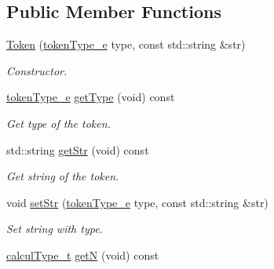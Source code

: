 \subsection*{Public Member Functions}
\begin{DoxyCompactItemize}
\item 
\hyperlink{class_token_ad84c27d6c4587fd359ffa52004bd370b}{Token} (\hyperlink{class_token_a706d105bff3282a406a9b218fcee1bfc}{token\+Type\+\_\+e} type, const std\+::string \&str)
\begin{DoxyCompactList}\small\item\em Constructor. \end{DoxyCompactList}\item 
\hypertarget{class_token_a1e326d33b7212772f3785fac4c3662be}{}\hyperlink{class_token_a706d105bff3282a406a9b218fcee1bfc}{token\+Type\+\_\+e} \hyperlink{class_token_a1e326d33b7212772f3785fac4c3662be}{get\+Type} (void) const \label{class_token_a1e326d33b7212772f3785fac4c3662be}

\begin{DoxyCompactList}\small\item\em Get type of the token. \end{DoxyCompactList}\item 
\hypertarget{class_token_ad38a4d20573a9c6c4bc2447a4701b51d}{}std\+::string \hyperlink{class_token_ad38a4d20573a9c6c4bc2447a4701b51d}{get\+Str} (void) const \label{class_token_ad38a4d20573a9c6c4bc2447a4701b51d}

\begin{DoxyCompactList}\small\item\em Get string of the token. \end{DoxyCompactList}\item 
\hypertarget{class_token_a5fbdba95469bc2afbaedf161e86d6d94}{}void \hyperlink{class_token_a5fbdba95469bc2afbaedf161e86d6d94}{set\+Str} (\hyperlink{class_token_a706d105bff3282a406a9b218fcee1bfc}{token\+Type\+\_\+e} type, const std\+::string \&str)\label{class_token_a5fbdba95469bc2afbaedf161e86d6d94}

\begin{DoxyCompactList}\small\item\em Set string with type. \end{DoxyCompactList}\item 
\hypertarget{class_token_afc6828db91b34b4b13afd9383b829c78}{}\hyperlink{mpfr_interface_8h_a993860352aef57b15399903c4475a608}{calcul\+Type\+\_\+t} \hyperlink{class_token_afc6828db91b34b4b13afd9383b829c78}{get\+N} (void) const \label{class_token_afc6828db91b34b4b13afd9383b829c78}


\end{DoxyCompactItemize}
